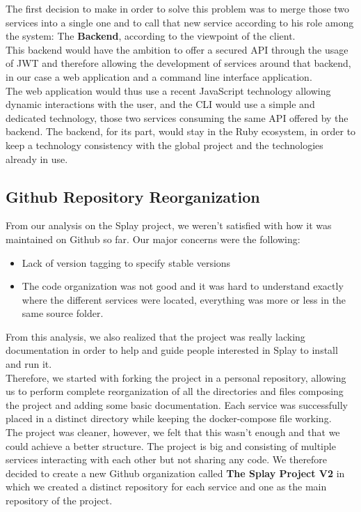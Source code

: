\documentclass{eplmastersthesis}
\begin{document}
        The first decision to make in order to solve this problem was to
        merge those two services into a single one and to call that new
        service according to his role among the system: The \textbf{Backend},
        according to the viewpoint of the client.\\
        This backend would have the ambition to offer a secured API through
        the usage of JWT \cite{JWT} and therefore allowing the development
        of services around that backend, in our case a web application and
        a command line interface application.\\

        The web application would thus use a recent JavaScript technology
        allowing dynamic interactions with the user, and the CLI would use
        a simple and dedicated technology, those two services consuming the
        same API offered by the backend. The backend, for its part, would
        stay in the Ruby ecosystem, in order to keep a technology consistency
        with the global project and the technologies already in use.

      \subsection{Github Repository Reorganization}

        From our analysis on the Splay project, we weren't satisfied with how
        it was maintained on Github so far. Our major concerns were the
        following:

        \begin{itemize}
          \item Lack of version tagging to specify stable versions
          \item The code organization was not good and it was hard to
          understand exactly where the different services were located,
          everything was more or less in the same source folder.
        \end{itemize}

        From this analysis, we also realized that the project was really
        lacking documentation in order to help and guide people interested
        in Splay to install and run it.\\

        Therefore, we started with forking the project in a personal repository,
        allowing us to perform complete reorganization of all the directories
        and files composing the project and adding some basic documentation.
        Each service was successfully placed in a distinct directory while
        keeping the docker-compose file working.\\
        The project was cleaner, however, we felt that this wasn't enough
        and that we could achieve a better structure. The project is big and
        consisting of multiple services interacting with each other but
        not sharing any code. We therefore decided to create a new Github
        organization called \textbf{The Splay Project V2} in which we created
        a distinct repository for each service and one as the main repository
        of the project.\\
\end{document}
